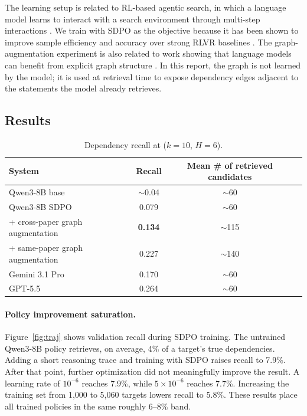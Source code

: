 The learning setup is related to RL-based agentic search, in which a language model learns to interact with a search environment through multi-step interactions \cite{lin2025agenticsearch}. We train with SDPO as the objective \cite{hubotter2026sdpo} because it has been shown to improve sample efficiency and accuracy over strong RLVR baselines \cite{hubotter2026sdpo}. The graph-augmentation experiment is also related to work showing that language models can benefit from explicit graph structure \cite{guo2025g1,zhang2025generalizable}. In this report, the graph is not learned by the model; it is used at retrieval time to expose dependency edges adjacent to the statements the model already retrieves.

\subsection{Results}
\label{sec:results}

\begin{table}[h]
	\centering
	\caption{Dependency recall at ($k{=}10$, $H{=}6$).}
	\label{tab:main}
	\begin{tabular}{lccl}
		\toprule
		System                                         & Recall         & Mean \# of retrieved candidates                     \\
		\midrule
		Qwen3-8B base                                  & $\sim$0.04    & $\sim$60     \\
		Qwen3-8B SDPO                          & 0.079          & $\sim$60  \\
		\quad + cross-paper graph augmentation\  & \textbf{0.134} & $\sim$115 \\
		\quad + same-paper graph augmentation                  & 0.227          & $\sim$140   \\
		\midrule
		Gemini 3.1 Pro                     & 0.170          & $\sim$60           \\
		GPT-5.5                            & 0.264          & $\sim$60        \\
		\bottomrule
	\end{tabular}
\end{table}

\paragraph{Policy improvement saturation.} Figure~\ref{fig:traj} shows validation recall during SDPO training. The untrained Qwen3-8B policy retrieves, on average, 4\% of a target's true dependencies. Adding a short reasoning trace and training with SDPO raises recall to 7.9\%. After that point, further optimization did not meaningfully improve the result. A learning rate of $10^{-6}$ reaches 7.9\%, while $5{\times}10^{-6}$ reaches 7.7\%. Increasing the training set from 1{,}000 to 5{,}060 targets lowers recall to 5.8\%. These results place all trained policies in the same roughly 6--8\% band.

